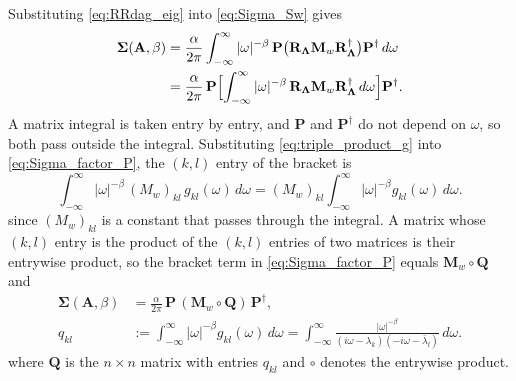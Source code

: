 \documentclass[12pt]{article}
\newcommand{\RL}{\mathbf{R}_{\boldsymbol{\Lambda}}}
\begin{document}
Substituting \eqref{eq:RRdag_eig} into \eqref{eq:Sigma_Sw} gives
\begin{equation}
    \begin{aligned}
    \boldsymbol{\Sigma}(\mathbf{A},\beta)
    &=\frac{\alpha}{2\pi}\int_{-\infty}^{\infty}|\omega|^{-\beta}\,
    \mathbf{P}\bigl(\RL\mathbf{M}_w\RL^{\dagger}\bigr)\mathbf{P}^{\dagger}\,d\omega \\
    &=\frac{\alpha}{2\pi}\,\mathbf{P}
    \Bigl[\int_{-\infty}^{\infty}|\omega|^{-\beta}\,\RL\mathbf{M}_w\RL^{\dagger}\,d\omega\Bigr]\mathbf{P}^{\dagger}.
    \end{aligned}
    \label{eq:Sigma_factor_P}
\end{equation}
A matrix integral is taken entry by entry, and $\mathbf{P}$ and $\mathbf{P}^{\dagger}$ do not depend on $\omega$, so both pass
outside the integral.
Substituting \eqref{eq:triple_product_g} into \eqref{eq:Sigma_factor_P}, the $(k,l)$ entry of the bracket is
\begin{equation}
    \int_{-\infty}^{\infty}|\omega|^{-\beta}\,(M_w)_{kl}\,g_{kl}(\omega)\,d\omega
    =(M_w)_{kl}\int_{-\infty}^{\infty}|\omega|^{-\beta}g_{kl}(\omega)\,d\omega.
    \label{eq:entry_integral}
\end{equation}
since $(M_w)_{kl}$ is a constant that passes through the integral. A matrix whose $(k,l)$ entry is the product of the $(k,l)$
entries of two matrices is their entrywise product, so the bracket term in \eqref{eq:Sigma_factor_P} equals $\mathbf{M}_w\circ\mathbf{Q}$ and
\begin{equation}
\boxed{\begin{aligned}
    \boldsymbol{\Sigma}(\mathbf{A},\beta)
    &=\frac{\alpha}{2\pi}\,\mathbf{P}\,(\mathbf{M}_w\circ\mathbf{Q})\,\mathbf{P}^{\dagger},\\
    q_{kl}
    &:=\int_{-\infty}^{\infty}|\omega|^{-\beta}g_{kl}(\omega)\,d\omega
    =\int_{-\infty}^{\infty}
    \frac{|\omega|^{-\beta}}{(i\omega-\lambda_k)(-i\omega-\bar\lambda_l)}\,d\omega .
\end{aligned}}
    \label{eq:Sigma_hadamard}
\end{equation}
where $\mathbf{Q}$ is the $n\times n$ matrix with entries $q_{kl}$ and $\circ$ denotes the entrywise product.
\end{document}
